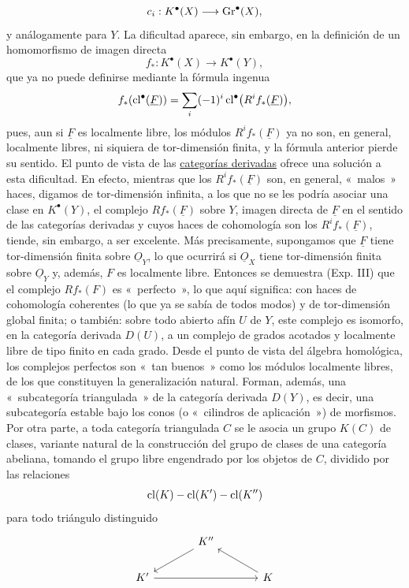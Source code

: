 \[
c_i:K^\bullet(X)\longrightarrow \operatorname{Gr}^\bullet(X),
\]
y análogamente para $Y$. La dificultad aparece, sin embargo, en la
definición de un homomorfismo de imagen directa
\begin{equation}\tag{3.1}
f_*:K^\bullet(X)\longrightarrow K^\bullet(Y),
\end{equation}
que ya no puede definirse mediante la fórmula ingenua
\[
f_*(\cl^\bullet(\underline{\sisi{E}{F}}))=\sum_i(-1)^i\cl^\bullet\bigl(R^if_*(\underline F)\bigr), %
\]
pues, aun si $\underline F$ es localmente libre, los módulos
$R^if_*(\underline F)$ ya no son, en general, localmente libres, ni siquiera
de tor-dimensión finita, y la fórmula anterior pierde su sentido. El punto
de vista de las \underline{categorías derivadas} ofrece una solución a esta
dificultad. En efecto, mientras que los $R^if_*(\underline F)$ son, en
general, «~malos~» haces, digamos de tor-dimensión infinita, a los que no se
les podría asociar una clase en $K^\bullet(Y)$, el complejo
$Rf_*(\underline F)$ sobre $Y$, imagen directa de $\underline F$ en el
sentido de las categorías derivadas y cuyos haces de cohomología son los
$R^if_*(\underline F)$, tiende, sin embargo, a ser excelente. Más
precisamente, supongamos que $\underline F$ tiene tor-dimensión finita sobre
$\underline O_Y$, lo que ocurrirá si $\underline O_X$ tiene tor-dimensión
finita sobre $\underline O_Y$ y, además, $F$ es localmente libre. Entonces se
demuestra (Exp. III) que el complejo $Rf_*(F)$ es «~perfecto~», lo que aquí
significa: con haces de cohomología coherentes (lo que ya se sabía de todos
modos) y de tor-dimensión global finita; o también: sobre todo abierto afín
$U$ de $Y$, este complejo es isomorfo, en la categoría derivada $D(U)$, a un
complejo de grados acotados y localmente libre de tipo finito en cada grado.
Desde el punto de vista del álgebra homológica, los complejos perfectos son
«~tan buenos~» como los módulos localmente libres, de los que constituyen la
generalización natural. Forman, además, una «~subcategoría triangulada~» de
la categoría derivada $D(Y)$, es decir, una subcategoría estable bajo los
conos (o «~cilindros de aplicación~») de morfismos. Por otra parte, a toda
categoría triangulada $C$ se le asocia un grupo $K(C)$ de clases, variante
natural de la construcción del grupo de clases de una categoría abeliana,
tomando el grupo libre engendrado por los objetos de $C$, dividido por las
relaciones
\[
\operatorname{cl}(K)-\operatorname{cl}(K')-\operatorname{cl}(K'')
\]
para todo triángulo distinguido
\[
\begin{tikzcd}[column sep=large]
 & K'' \arrow[dl] & \\
K' \arrow[rr] & & K \arrow[ul]
\end{tikzcd}
\]
